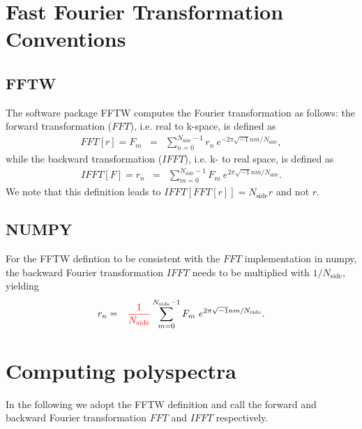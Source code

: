 \documentclass[twoside,10pt]{article}
\begin{document}
\begin{multicols}{2} %

\section{Fast Fourier Transformation Conventions}

\subsection{FFTW}

The software package {\sc FFTW} computes the Fourier transformation as follows: the forward transformation ($FFT$), i.e. real to k-space, is defined as
\begin{eqnarray}
 FFT[r] = F_m &=& \sum_{n=0}^{N_\mathrm{side}-1} r_n\ e^{-2\pi \sqrt{-1} n m  / N_\mathrm{side}},
\end{eqnarray}
while the backward transformation ($IFFT$), i.e. k- to real space, is defined as
\begin{eqnarray}
 IFFT[F] = r_n &=& \sum_{m=0}^{N_\mathrm{side}-1} F_m\ e^{2\pi \sqrt{-1} n m / N_\mathrm{side}}.
\end{eqnarray}
We note that this definition leads to $IFFT[FFT[r]] = N_\mathrm{side} r$ and not $r$.

\subsection{NUMPY}

For the {\sc FFTW} defintion to be consistent with the $FFT$ implementation in {\sc numpy}, the backward Fourier transformation $IFFT$ needs to be multiplied with $1/N_\mathrm{side}$, yielding
\begin{eqnarray}
 r_n &=&  \textcolor{red}{\frac{1}{N_\mathrm{side}}} \sum_{m=0}^{N_\mathrm{side}-1} F_m\ e^{2\pi \sqrt{-1} n m / N_\mathrm{side}}.
\end{eqnarray}

\section{Computing polyspectra}

In the following we adopt the {\sc FFTW} definition and call the forward and backward Fourier transformation $FFT$ and $IFFT$ respectively.


\end{multicols}
\end{document}
